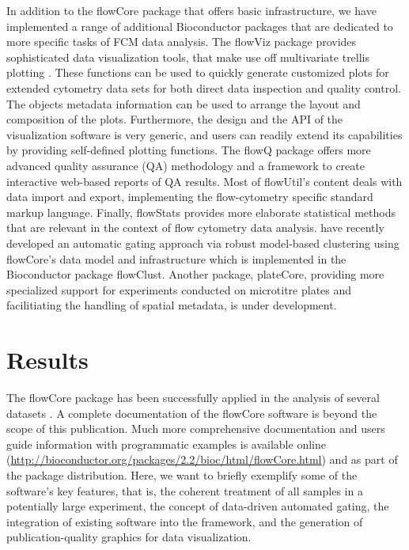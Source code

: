 \documentclass[12pt]{article}
\newcommand{\Rpackage}[1]{{\textsf{#1}}}
\begin{document}
In addition to the \Rpackage{flowCore} package that offers basic
infrastructure, we have implemented a range of additional Bioconductor
packages that are dedicated to more specific tasks of FCM data
analysis. The \Rpackage{flowViz} package \citep{sarkar2008ufv}
provides sophisticated data visualization tools, that make use off
multivariate trellis plotting \citep{lattice}.  These functions can be
used to quickly generate customized plots for extended cytometry data
sets for both direct data inspection and quality control.  The objects
metadata information can be used to arrange the layout and composition
of the plots.  Furthermore, the design and the API of the
visualization software is very generic, and users can readily extend
its capabilities by providing self-defined plotting functions.  The
\Rpackage{flowQ} package offers more advanced quality assurance (QA)
methodology and a framework to create interactive web-based reports of
QA results.  Most of \Rpackage{flowUtil}'s content deals with data
import and export, implementing the flow-cytometry specific standard
markup language.  Finally, \Rpackage{flowStats} provides more
elaborate statistical methods that are relevant in the context of flow
cytometry data analysis. \cite{lo2008agf} have recently developed an
automatic gating approach via robust model-based clustering using
\Rpackage{flowCore}'s data model and infrastructure which is
implemented in the Bioconductor package \Rpackage{flowClust}. Another
package, \Rpackage{plateCore}, providing more specialized support for
experiments conducted on microtitre plates and facilitiating the
handling of spatial metadata, is under development.

\section*{Results}
The \Rpackage{flowCore} package has been successfully applied in the
analysis of several datasets
\citep{gasparetto2004ice,brinkman2007hcf}. A complete documentation of
the \Rpackage{flowCore} software is beyond the scope of this
publication.  Much more comprehensive documentation and users guide
information with programmatic examples is available online
(\url{http://bioconductor.org/packages/2.2/bioc/html/flowCore.html})
and as part of the package distribution. Here, we want to briefly
exemplify some of the software's key features, that is, the coherent
treatment of all samples in a potentially large experiment, the
concept of data-driven automated gating, the integration of existing
software into the framework, and the generation of publication-quality
graphics for data visualization.
\end{document}
